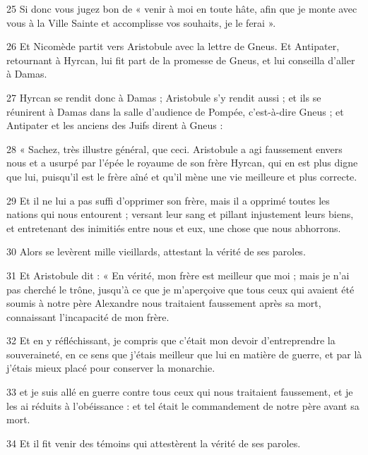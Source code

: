 \par 25 Si donc vous jugez bon de « venir à moi en toute hâte, afin que je monte avec vous à la Ville Sainte et accomplisse vos souhaits, je le ferai ».

\par 26 Et Nicomède partit vers Aristobule avec la lettre de Gneus. Et Antipater, retournant à Hyrcan, lui fit part de la promesse de Gneus, et lui conseilla d'aller à Damas.

\par 27 Hyrcan se rendit donc à Damas ; Aristobule s'y rendit aussi ; et ils se réunirent à Damas dans la salle d'audience de Pompée, c'est-à-dire Gneus ; et Antipater et les anciens des Juifs dirent à Gneus :

\par 28 « Sachez, très illustre général, que ceci. Aristobule a agi faussement envers nous et a usurpé par l'épée le royaume de son frère Hyrcan, qui en est plus digne que lui, puisqu'il est le frère aîné et qu'il mène une vie meilleure et plus correcte.

\par 29 Et il ne lui a pas suffi d'opprimer son frère, mais il a opprimé toutes les nations qui nous entourent ; versant leur sang et pillant injustement leurs biens, et entretenant des inimitiés entre nous et eux, une chose que nous abhorrons.

\par 30 Alors se levèrent mille vieillards, attestant la vérité de ses paroles.

\par 31 Et Aristobule dit : « En vérité, mon frère est meilleur que moi ; mais je n'ai pas cherché le trône, jusqu'à ce que je m'aperçoive que tous ceux qui avaient été soumis à notre père Alexandre nous traitaient faussement après sa mort, connaissant l'incapacité de mon frère.

\par 32 Et en y réfléchissant, je compris que c'était mon devoir d'entreprendre la souveraineté, en ce sens que j'étais meilleur que lui en matière de guerre, et par là j'étais mieux placé pour conserver la monarchie.

\par 33 et je suis allé en guerre contre tous ceux qui nous traitaient faussement, et je les ai réduits à l'obéissance : et tel était le commandement de notre père avant sa mort.

\par 34 Et il fit venir des témoins qui attestèrent la vérité de ses paroles.

